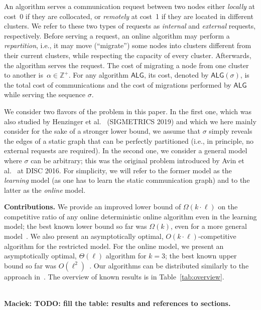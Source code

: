 \documentclass[manuscript,screen=true, review, anonymous]{acmart}
\newcommand{\ALG}{\textsf{ALG}\xspace}
\newcommand\maciek[1]{\color{brown}\textbf{\\ Maciek: #1}\color{black}}
\begin{document}
An algorithm serves a communication request between two nodes
either \emph{locally} at cost~0
if they are collocated,
or \emph{remotely} at cost~1
if they are located in different clusters.
We refer to these two types of requests as \emph{internal}
and \emph{external} requests, respectively.
Before serving a request,
an online algorithm may perform a \emph{repartition},
i.e.,
it may move (``migrate'') some nodes into clusters different from their current clusters, while respecting the capacity of every cluster. 
Afterwards, 
the algorithm serves the  request.
The cost of migrating a node from one cluster to another
is~$\alpha \in \mathbb{Z}^+$.
For any algorithm $\ALG$,
its cost,
denoted by $\ALG(\sigma)$,
is the total cost of communications and
the cost of migrations performed by $\ALG$ while serving the sequence $\sigma$.

We consider two flavors of the problem
in this paper. In the first one, which
was also studied by Henzinger et al.~\cite{sigmetrics19_partitioning}
(SIGMETRICS 2019) and which
we here mainly consider for the sake of a stronger
lower bound, we assume that $\sigma$
simply reveals the edges of a static graph
that can be perfectly partitioned
(i.e., in principle, no external requests
are required). 
In the second one, we consider a general
model where $\sigma$ can be arbitrary;
this was the original problem introduced
by Avin et al.~\cite{repartition-disc} at DISC 2016.
For simplicity, we will refer to the former
model as the \emph{learning} model (as
one has to learn the static communication graph) 
and to the latter as the \emph{online} model.


\noindent \textbf{Contributions.}
We provide an improved lower bound 
of $\Omega(k\cdot\ell)$ on the competitive ratio of any online deterministic online algorithm 
even in the learning model;
the best known lower bound so far was $\Omega(k)$,
even for a more general model~\cite{repartition-disc}.
We also present an asymptotically optimal, 
$O(k\cdot \ell)$-competitive algorithm
for the restricted model.
For the online model, we present  
an asymptotically optimal,
$\Theta(\ell)$ algorithm for $k=3$;
the best known upper bound 
so far was $O(\ell^2)$~\cite{repartition-disc}.
%
Our algorithms can be distributed
similarly to the approach in~\cite{sigmetrics19_partitioning}.
The overview of known results is in Table~\ref{tab:overview}.

\maciek{TODO: fill the table: results and references to sections.}
\end{document}

